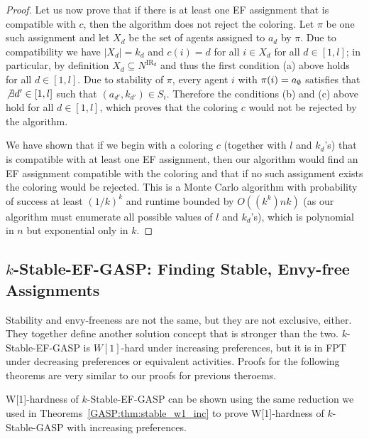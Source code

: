 \begin{proof}
Let us now prove that if there is at least one EF assignment that is compatible with $c$, then the algorithm does not reject the coloring. Let $\pi$ be one such assignment and let $X_d$ be the set of agents assigned to $a_d$ by $\pi$. Due to compatibility we have $|X_d| = k_d$ and $c(i) = d$ for all $i \in X_d$ for all $d\in [1, l]$; in particular, by definition $X_d \subseteq N^{\text{IR}_d}$ and thus the first condition (a) above holds for all $d\in [1, l]$. Due to stability of $\pi$, every agent $i$ with $\pi(i) = a_{\emptyset}$ satisfies that $\not\exists d'\in [1, l]$ such that $(a_{d'}, k_{d'}) \in S_i$. Therefore the conditions (b) and (c) above hold for all $d\in [1, l]$, which proves that the coloring $c$ would not be rejected by the algorithm.

We have shown that if we begin with a coloring $c$ (together with $l$ and $k_d$'s) that is compatible with at least one EF assignment, then our algorithm would find an EF assignment compatible with the coloring and that if no such assignment exists the coloring would be rejected. This is a Monte Carlo algorithm with probability of success at least $(1/k)^k$ and runtime bounded by $O((k^k)nk)$ (as our algorithm must enumerate all possible values of $l$ and $k_d$'s), which is polynomial in $n$ but exponential only in $k$. 
\end{proof}





\subsection{$k$-Stable-EF-GASP: Finding Stable, Envy-free Assignments}
Stability and envy-freeness are not the same, but they are not exclusive, either. They together define another solution concept that is stronger than the two.
$k$-Stable-EF-GASP is $W[1]$-hard under increasing preferences, but it is in FPT under decreasing preferences or equivalent activities.
Proofs for the following theorems are very similar to our proofs for previous theroems. 

W[1]-hardness of $k$-Stable-EF-GASP can be shown using the same reduction we used in Theorems~\ref{GASP:thm:stable_w1_inc} to prove W[1]-hardness of $k$-Stable-GASP with increasing preferences.

